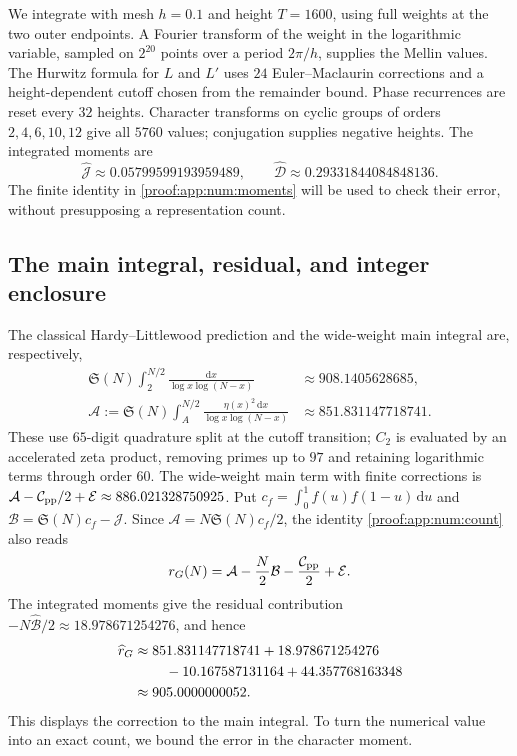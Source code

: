 \documentclass[12pt,a4paper]{amsart}
\numberwithin{equation}{section}
\theoremstyle{plain}
\theoremstyle{definition}
\theoremstyle{remark}
\begin{document}
We integrate with mesh $h=0.1$ and height $T=1600$, using full weights
at the two outer endpoints. A Fourier transform of the weight in the
logarithmic variable, sampled on $2^{20}$ points over a period $2\pi/h$,
supplies the Mellin values. The Hurwitz formula for $L$ and $L'$ uses
$24$ Euler--Maclaurin corrections and a height-dependent cutoff chosen
from the remainder bound. Phase recurrences are reset every $32$ heights.
Character transforms on cyclic groups of orders $2,4,6,10,12$ give all
$5760$ values; conjugation supplies negative heights. The integrated
moments are
\[
 \widehat{\mathcal J}\approx0.05799599193959489,\qquad
 \widehat{\mathcal D}\approx0.29331844084848136.
\]
The finite identity in \eqref{proof:app:num:moments} will be used to
check their error, without presupposing a representation count.

\subsection{The main integral, residual, and integer enclosure}
\label{proof:app:num:interval}

The classical Hardy--Littlewood prediction and the wide-weight main
integral are, respectively,
\begin{align*}
 \mathfrak S(N)\int_2^{N/2}\frac{\mathrm{d}x}{\log x\log(N-x)}
     &\approx908.1405628685,\\
 \mathcal A:=\mathfrak S(N)\int_A^{N/2}
             \frac{\eta(x)^2\,\mathrm{d}x}{\log x\log(N-x)}
     &\approx851.831147718741.
\end{align*}
These use $65$-digit quadrature split at the cutoff transition;
$C_2$ is evaluated by an accelerated zeta product, removing primes up
to $97$ and retaining logarithmic terms through order $60$.
The wide-weight main term with finite corrections is
$\mathcal A-\mathcal C_{\rm pp}/2+\mathcal E\approx886.021328750925$.
Put $c_f=\int_0^1f(u)f(1-u)\,\mathrm{d}u$ and
$\mathcal B=\mathfrak S(N)c_f-\mathcal J$. Since
$\mathcal A=N\mathfrak S(N)c_f/2$, the identity \eqref{proof:app:num:count}
also reads
\[
 r_G(N)=\mathcal A-\frac N2\mathcal B
                   -\frac{\mathcal C_{\rm pp}}2+\mathcal E.
\]
The integrated moments give the residual contribution
$-N\widehat{\mathcal B}/2\approx18.978671254276$, and hence
\begin{equation}\label{proof:app:num:integral-centre}
 \begin{aligned}
 \widehat r_G
 &\approx851.831147718741+18.978671254276\\
 &\hspace{8mm}-10.167587131164+44.357768163348\\
 &\approx905.0000000052.
 \end{aligned}
\end{equation}
This displays the correction to the main integral. To turn the numerical
value into an exact count, we bound the error in the character moment.
\end{document}
